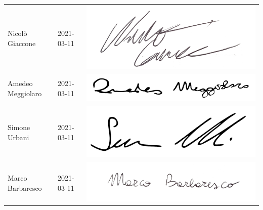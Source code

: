 \begin{center}
\begin{table}[h!]
\begin{tabular}{p{150px} p{110px} p{110px}}
                    Nicolò Giaccone & 2021-03-11 & \includegraphics[scale=0.03]{../../../Images/firme/firmaGiacconeNicolo.png}\\
                    Amedeo Meggiolaro & 2021-03-11 & \includegraphics[scale=0.05]{../../../Images/firme/firmaAmedeoMeggiolaro.png} \\
                    Simone Urbani & 2021-03-11 & \includegraphics[scale=0.05]{../../../Images/firme/firmaSimoneUrbani.png} \\
                    Marco Barbaresco & 2021-03-11 & \includegraphics[scale=0.06]{../../../Images/firme/firmaMarcoBarbaresco.png} \\
                \end{tabular}
            \end{table}
        \end{center}
